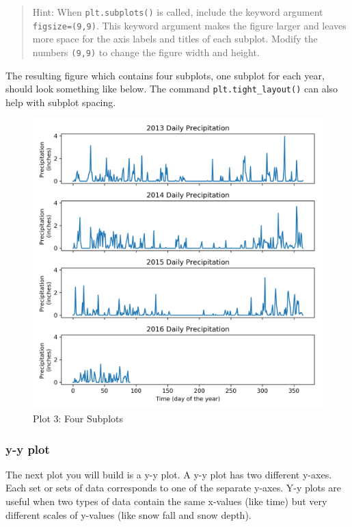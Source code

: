 \documentclass[11pt]{article}
\makeatletter
\def\maxwidth{\ifdim\Gin@nat@width>\linewidth\linewidth
    \else\Gin@nat@width\fi}
\let\Oldincludegraphics\includegraphics
\renewcommand{\includegraphics}[1]{\Oldincludegraphics[width=.8\maxwidth]{#1}}
\makeatother
\begin{document}
\begin{quote}
Hint: When \texttt{plt.subplots()} is called, include the keyword
argument \texttt{figsize=(9,9)}. This keyword argument makes the figure
larger and leaves more space for the axis labels and titles of each
subplot. Modify the numbers \texttt{(9,9)} to change the figure width
and height.
\end{quote}

The resulting figure which contains four subplots, one subplot for each
year, should look something like below. The command
\texttt{plt.tight\_layout()} can also help with subplot spacing.

\begin{figure}[h!]
\centering
\includegraphics{images/plot3.png}
\caption{Plot 3: Four Subplots}
\end{figure}

\newpage
    \hypertarget{y-y-plot}{%
\subsubsection{y-y plot}\label{y-y-plot}}

The next plot you will build is a y-y plot. A y-y plot has two different
y-axes. Each set or sets of data corresponds to one of the separate
y-axes. Y-y plots are useful when two types of data contain the same
x-values (like time) but very different scales of y-values (like snow
fall and snow depth).
\end{document}
